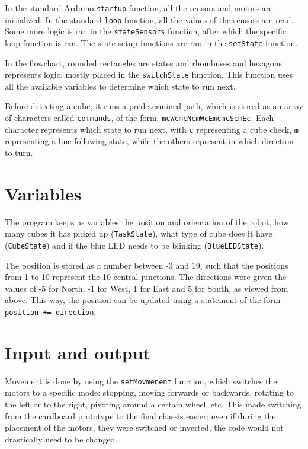 \documentclass[11pt,a4paper,twoside]{article}
\begin{document}
In the standard Arduino \verb|startup| function, all the sensors and motors are
initialized. In the standard \verb|loop| function, all the values of the sensors are read.
Some more logic is ran in the \verb|stateSensors| function, after which the 
specific loop function is ran. The state setup functions are ran in the \verb|setState| function.

In the flowchart, rounded rectangles are states and rhombuses and hexagons
represents logic, mostly placed in the \verb|switchState| function.
This function uses all the available variables to determine which state to
run next.

Before detecting a cube, it runs a predetermined path, which is
stored as an array of characters called \verb|commands|, of the form: \verb|mcWcmcNcmWcEmcmcScmEc|. 
Each character represents which state to run next, with \verb|c| representing a cube check, 
\verb|m| representing a line following state, while the others represent in which direction to turn.

\section{Variables}

The program keeps as variables the position and orientation of the robot,
how many cubes it has picked up (\verb|TaskState|), what type of cube does it have 
(\verb|CubeState|) and if the blue LED needs to be blinking (\verb|BlueLEDState|).

The position is stored as a number between -3 and 19, such that the positions from
1 to 10 represent the 10 central junctions. The directions were given the values of -5 for North,
-1 for West, 1 for East and 5 for South, as viewed from above. This way, the position can
be updated using a statement of the form \verb|position += direction|.

\section{Input and output}

Movement is done by using the \verb|setMovmenent| function, which switches
the motors to a specific mode: stopping, moving forwards or backwards, 
rotating to the left or to the right, pivoting around a certain wheel, etc.
This made switching from the cardboard prototype to the final chassis easier: even 
if during the placement of the motors, they were switched or inverted, the code
would not drastically need to be changed.
\end{document}
